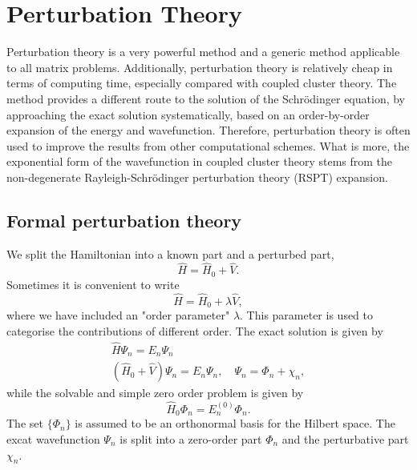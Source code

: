 \chapter{Perturbation Theory}
\label{ch:perturbation}

Perturbation theory is a very powerful method and a generic method applicable to all 
matrix problems. Additionally, perturbation theory is relatively cheap in terms of computing
time, especially compared with coupled cluster theory. The method provides a different 
route to the solution of the Schrödinger equation, by approaching the exact solution 
systematically, based on an order-by-order expansion of the energy and wavefunction. 
Therefore, perturbation theory is often used to improve the results from other computational
schemes. What is more, the exponential form of the wavefunction in coupled cluster theory 
stems from the non-degenerate Rayleigh-Schrödinger perturbation theory (RSPT) expansion.

\section{Formal perturbation theory}

We split the Hamiltonian into a known part and a perturbed part,
\begin{equation}
    \hat{H} = \hat{H}_0 + \hat{V}.
\end{equation}
Sometimes it is convenient to write
\begin{equation}
    \label{eq:schrodinger_w_order_param}
    \hat{H} = \hat{H}_0 + \lambda\hat{V},
\end{equation}
where we have included an "order parameter" $\lambda$. This parameter is used to categorise
the contributions of different order. 
The exact solution is given by
\begin{equation}
    \label{eq:perturbation_schrodinger}
    \begin{gathered}
        \hat{H} \Psi_n = E_n \Psi_n \\
        (\hat{H}_0 + \hat{V}) \Psi_n = E_n \Psi_n, \quad \Psi_n = \Phi_n + \chi_n,
    \end{gathered}
\end{equation}
while the solvable and simple zero order problem is given by
\begin{equation}
    \label{eq:zero_order_perturbed_schrodinger}
    \hat{H}_0 \Phi_n = E_n^{(0)} \Phi_n.
\end{equation}
The set $\{\Phi_n\}$ is assumed to be an orthonormal basis for the Hilbert space. The 
excat wavefunction $\Psi_n$ is split into a zero-order part $\Phi_n$ and the 
perturbative part $\chi_n$.

